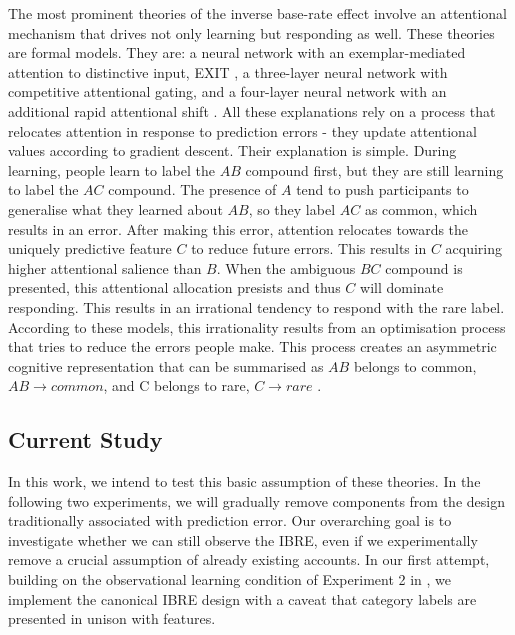 \documentclass[10pt,letterpaper]{article}
\begin{document}
The most prominent theories of the inverse base-rate effect involve an attentional mechanism that drives not only learning but responding as well.
These theories are formal models.
They are: a neural network with an exemplar-mediated attention to distinctive input, EXIT \cite{kruschke2001toward}, a three-layer neural network with competitive attentional gating, and a four-layer neural network with an additional rapid attentional shift \cite{paskewitz2020dissecting}.
All these explanations rely on a process that relocates attention in response to prediction errors - they update attentional values according to gradient descent.
Their explanation is simple.
During learning, people learn to label the $AB$ compound first, but they are still learning to label the $AC$ compound.
The presence of $A$ tend to push participants to generalise what they learned about $AB$, so they label $AC$ as common, which results in an error.
After making this error, attention relocates towards the uniquely predictive feature $C$ to reduce future errors.
This results in $C$ acquiring higher attentional salience than $B$.
When the ambiguous $BC$ compound is presented, this attentional allocation presists and thus $C$ will dominate responding.
This results in an irrational tendency to respond with the rare label.
According to these models, this irrationality results from an optimisation process that tries to reduce the errors people make.
This process creates an asymmetric cognitive representation that can be summarised as $AB$ belongs to common, $AB \to common$, and C belongs to rare, $C \to rare$ \cite{kruschke2001inverse}.

\subsection{Current Study}

In this work, we intend to test this basic assumption of these theories.
In the following two experiments, we will gradually remove components from the design traditionally associated with prediction error.
Our overarching goal is to investigate whether we can still observe the IBRE, even if we experimentally remove a crucial assumption of already existing accounts.
In our first attempt, building on the observational learning condition of Experiment 2 in , we implement the canonical IBRE design with a caveat that category labels are presented in unison with features.
\end{document}
